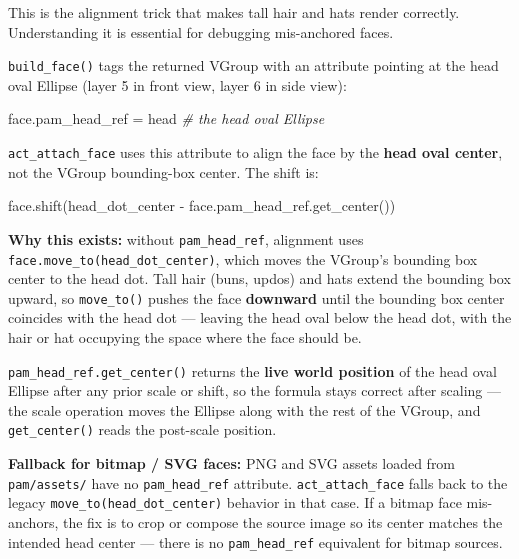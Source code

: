 \documentclass[
  12pt,
  letterpaper,
]{book}
\newenvironment{Shaded}{}{}
\newcommand{\CommentTok}[1]{\textcolor[rgb]{0.38,0.63,0.69}{\textit{#1}}}
\newcommand{\NormalTok}[1]{#1}
\newcommand{\OperatorTok}[1]{\textcolor[rgb]{0.40,0.40,0.40}{#1}}
\begin{document}
This is the alignment trick that makes tall hair and hats render
correctly. Understanding it is essential for debugging mis-anchored
faces.

\texttt{build\_face()} tags the returned VGroup with an attribute
pointing at the head oval Ellipse (layer 5 in front view, layer 6 in
side view):

\begin{Shaded}
\begin{Highlighting}[]
\NormalTok{face.pam\_head\_ref }\OperatorTok{=}\NormalTok{ head   }\CommentTok{\# the head oval Ellipse}
\end{Highlighting}
\end{Shaded}

\texttt{act\_attach\_face} uses this attribute to align the face by the
\textbf{head oval center}, not the VGroup bounding-box center. The shift
is:

\begin{Shaded}
\begin{Highlighting}[]
\NormalTok{face.shift(head\_dot\_center }\OperatorTok{{-}}\NormalTok{ face.pam\_head\_ref.get\_center())}
\end{Highlighting}
\end{Shaded}

\textbf{Why this exists:} without \texttt{pam\_head\_ref}, alignment
uses \texttt{face.move\_to(head\_dot\_center)}, which moves the VGroup's
bounding box center to the head dot. Tall hair (buns, updos) and hats
extend the bounding box upward, so \texttt{move\_to()} pushes the face
\textbf{downward} until the bounding box center coincides with the head
dot --- leaving the head oval below the head dot, with the hair or hat
occupying the space where the face should be.

\texttt{pam\_head\_ref.get\_center()} returns the \textbf{live world
position} of the head oval Ellipse after any prior scale or shift, so
the formula stays correct after scaling --- the scale operation moves
the Ellipse along with the rest of the VGroup, and
\texttt{get\_center()} reads the post-scale position.

\textbf{Fallback for bitmap / SVG faces:} PNG and SVG assets loaded from
\texttt{pam/assets/} have no \texttt{pam\_head\_ref} attribute.
\texttt{act\_attach\_face} falls back to the legacy
\texttt{move\_to(head\_dot\_center)} behavior in that case. If a bitmap
face mis-anchors, the fix is to crop or compose the source image so its
center matches the intended head center --- there is no
\texttt{pam\_head\_ref} equivalent for bitmap sources.
\end{document}
